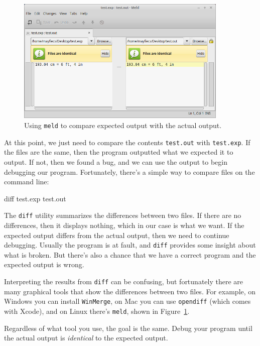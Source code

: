 \documentclass[12pt]{book}
\theoremstyle{exercise}
\begin{document}
\begin{figure}[!ht]
\begin{center}
\includegraphics[width=0.9\textwidth]{figs/meld.png}
\caption{Using {\tt meld} to compare expected output with the actual output.}
\label{fig.meld}
\end{center}
\end{figure}

At this point, we just need to compare the contents {\tt test.out} with {\tt test.exp}.
If the files are the same, then the program outputted what we expected it to output.
If not, then we found a bug, and we can use the output to begin debugging our program.
Fortunately, there's a simple way to compare files on the command line:

\begin{stdout}
diff test.exp test.out
\end{stdout}

The {\tt diff} utility summarizes the differences between two files.
If there are no differences, then it displays nothing, which in our case is what we want.
If the expected output differs from the actual output, then we need to continue debugging.
Usually the program is at fault, and {\tt diff} provides some insight about what is broken.
But there's also a chance that we have a correct program and the expected output is wrong.

Interpreting the results from {\tt diff} can be confusing, but fortunately there are many graphical tools that show the differences between two files.
For example, on Windows you can install {\tt WinMerge}, on Mac you can use {\tt opendiff} (which comes with Xcode), and on Linux there's {\tt meld}, shown in Figure~\ref{fig.meld}.

Regardless of what tool you use, the goal is the same.
Debug your program until the actual output is {\em identical} to the expected output.
\end{document}
